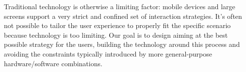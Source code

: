 Traditional technology is otherwise a limiting factor: mobile devices and large screens support a very strict and confined set of interaction strategies. It's often not possible to tailor the user experience to properly fit the specific scenario because technology is too limiting.
Our goal is to design aiming at the best possible strategy for the users, building the technology around this process and avoiding the constraints typically introduced by more general-purpose hardware/software combinations.

